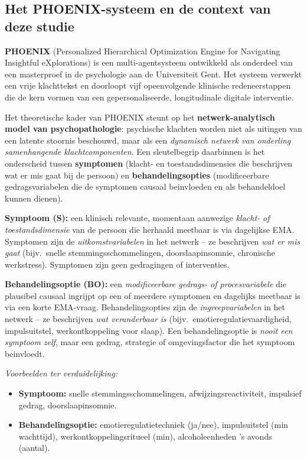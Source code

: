 \documentclass[11pt,a4paper]{article}
\begin{document}
\subsection*{Het PHOENIX-systeem en de context van deze studie}

\textbf{PHOENIX} (Personalized Hierarchical Optimization Engine for Navigating
Insightful eXplorations) is een multi-agentsysteem ontwikkeld als onderdeel van
een masterproef in de psychologie aan de Universiteit Gent. Het systeem verwerkt
een vrije klachttekst en doorloopt vijf opeenvolgende klinische redeneerstappen
die de kern vormen van een gepersonaliseerde, longitudinale digitale interventie.

Het theoretische kader van PHOENIX steunt op het \textbf{netwerk-analytisch model
van psychopathologie}: psychische klachten worden niet
als uitingen van een latente stoornis beschouwd, maar als een \emph{dynamisch
netwerk van onderling samenhangende klachtcomponenten}. Een sleutelbegrip daarbinnen
is het onderscheid tussen \textbf{symptomen} (klacht- en toestandsdimensies die
beschrijven wat er mis gaat bij de persoon) en \textbf{behandelingsopties}
(modificeerbare gedragsvariabelen die de symptomen causaal beinvloeden en als
behandeldoel kunnen dienen).

\vspace{0.4em}
\begin{instrbox}[title={Kerndefinities: symptoom versus behandelingsoptie}]
\small
\textbf{Symptoom (S):} een klinisch relevante, momentaan aanwezige
\emph{klacht- of toestandsdimensie} van de persoon die herhaald meetbaar is via
dagelijkse EMA. Symptomen zijn de \emph{uitkomstvariabelen} in het netwerk -- ze
beschrijven \emph{wat er mis gaat} (bijv.\ snelle stemmingsschommelingen, doorslaapinsomnie,
chronische werkstress). Symptomen zijn geen gedragingen of interventies.

\medskip
\textbf{Behandelingsoptie (BO):} een \emph{modificeerbare gedrags- of procesvariabele}
die plausibel causaal ingrijpt op een of meerdere symptomen en dagelijks meetbaar
is via een korte EMA-vraag. Behandelingsopties zijn de \emph{ingreepvariabelen} in het
netwerk -- ze beschrijven \emph{wat veranderbaar is} (bijv.\ emotieregulatievaardigheid,
impulsuitstel, werkontkoppeling voor slaap). Een behandelingsoptie is \emph{nooit een symptoom zelf},
maar een gedrag, strategie of omgevingsfactor die het symptoom beinvloedt.

\medskip\small
\textit{Voorbeelden ter verduidelijking:}
\begin{itemize}[topsep=1pt,itemsep=0pt]
\item \textbf{Symptoom:} snelle stemmingsschommelingen, afwijzingsreactiviteit, impulsief gedrag, doorslaapinsomnie.
\item \textbf{Behandelingsoptie:} emotieregulatietechniek (ja/nee), impulsuitstel (min wachttijd),
werkontkoppelingsritueel (min), alcoholeenheden 's avonds (aantal).
\end{itemize}
\end{instrbox}
\end{document}
